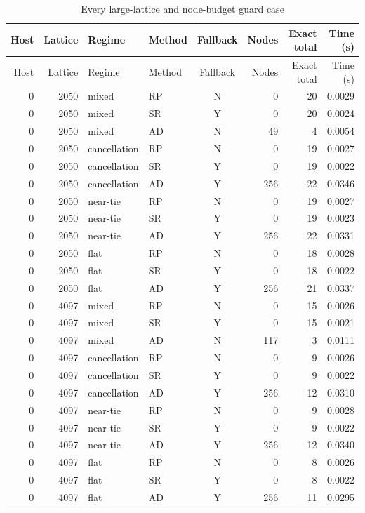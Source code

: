 \begingroup\small\setlength{\tabcolsep}{3pt}
\begin{longtable}{rrllcrrr}
\caption{Every large-lattice and node-budget guard case}\label{tab:guards61}\\
\hline
Host & Lattice & Regime & Method & Fallback & Nodes & Exact total & Time (s) \\
\hline\endfirsthead
\hline
Host & Lattice & Regime & Method & Fallback & Nodes & Exact total & Time (s) \\
\hline\endhead
0 & 2050 & mixed & RP & N & 0 & 20 & 0.0029 \\
0 & 2050 & mixed & SR & Y & 0 & 20 & 0.0024 \\
0 & 2050 & mixed & AD & N & 49 & 4 & 0.0054 \\
0 & 2050 & cancellation & RP & N & 0 & 19 & 0.0027 \\
0 & 2050 & cancellation & SR & Y & 0 & 19 & 0.0022 \\
0 & 2050 & cancellation & AD & Y & 256 & 22 & 0.0346 \\
0 & 2050 & near-tie & RP & N & 0 & 19 & 0.0027 \\
0 & 2050 & near-tie & SR & Y & 0 & 19 & 0.0023 \\
0 & 2050 & near-tie & AD & Y & 256 & 22 & 0.0331 \\
0 & 2050 & flat & RP & N & 0 & 18 & 0.0028 \\
0 & 2050 & flat & SR & Y & 0 & 18 & 0.0022 \\
0 & 2050 & flat & AD & Y & 256 & 21 & 0.0337 \\
0 & 4097 & mixed & RP & N & 0 & 15 & 0.0026 \\
0 & 4097 & mixed & SR & Y & 0 & 15 & 0.0021 \\
0 & 4097 & mixed & AD & N & 117 & 3 & 0.0111 \\
0 & 4097 & cancellation & RP & N & 0 & 9 & 0.0026 \\
0 & 4097 & cancellation & SR & Y & 0 & 9 & 0.0022 \\
0 & 4097 & cancellation & AD & Y & 256 & 12 & 0.0310 \\
0 & 4097 & near-tie & RP & N & 0 & 9 & 0.0028 \\
0 & 4097 & near-tie & SR & Y & 0 & 9 & 0.0022 \\
0 & 4097 & near-tie & AD & Y & 256 & 12 & 0.0340 \\
0 & 4097 & flat & RP & N & 0 & 8 & 0.0026 \\
0 & 4097 & flat & SR & Y & 0 & 8 & 0.0022 \\
0 & 4097 & flat & AD & Y & 256 & 11 & 0.0295 \\

\end{longtable}
